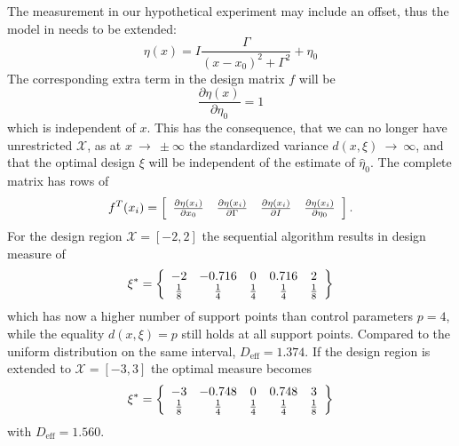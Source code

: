 \documentclass[12pt]{iopart}
\begin{document}
The measurement in our hypothetical experiment may include an offset, thus the model in  needs to be extended:
\begin{equation}
\eta(x) = I \frac{\Gamma}{(x - x_0)^2 + \Gamma^2} + \eta_0
\label{eq:lorentz4}
\end{equation}
The corresponding extra term in the design matrix $f$ will be
\begin{equation}
\frac{\partial \eta(x)}{\partial \eta_0} = 1
\end{equation}
which is independent of $x$. This has the consequence, that we can no longer have unrestricted $\mathcal{X}$, as at $x~\rightarrow~\pm\infty$ the standardized variance $d(x,\xi)~\rightarrow~\infty$, and that the optimal design $\xi$ will be independent of the estimate of $\hat \eta_0$. The complete matrix has rows of
\begin{equation}
 f^T(x_i) = \left[
  \begin{array}{l l l l}
   \frac{\partial \eta(x_i)}{\partial x_0} & \frac{\partial \eta(x_i)}{\partial \Gamma} & \frac{\partial \eta(x_i)}{\partial I} & \frac{\partial \eta(x_i)}{\partial \eta_0}
  \end{array} \right ].
\end{equation}
For the design region $\mathcal{X} = [-2, 2]$ the sequential algorithm results in design measure of
\begin{equation}
\xi^* = \left\{
  \begin{array}{c c c c c}
    -2 & -0.716 & 0 & 0.716 & 2\\
    \frac{1}{8} & \frac{1}{4} & \frac{1}{4} & \frac{1}{4} & \frac{1}{8}\\
  \end{array} \right \}
\end{equation}
which has now a higher number of support points than control parameters $p=4$, while the equality $d(x, \xi) = p$ still holds at all support points. Compared to the uniform distribution on the same interval, $D_\mathrm{eff} = 1.374$. If the design region is extended to $\mathcal{X} = [-3, 3]$ the optimal measure becomes
\begin{equation}
\xi^* = \left\{
  \begin{array}{c c c c c}
    -3 & -0.748 & 0 & 0.748 & 3\\
    \frac{1}{8} & \frac{1}{4} & \frac{1}{4} & \frac{1}{4} & \frac{1}{8}\\
  \end{array} \right \}
\end{equation}
with $D_\mathrm{eff} = 1.560$.
\end{document}
